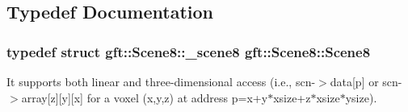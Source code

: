 \subsection{Typedef Documentation}
\hypertarget{namespacegft_1_1Scene8_a78f9a172f8a505f9577adac7f85bc009}{
\subsubsection[{Scene8}]{\setlength{\rightskip}{0pt plus 5cm}typedef struct {\bf gft\-::\-Scene8\-::\-\_\-scene8}  {\bf gft\-::\-Scene8\-::\-Scene8}}}\label{namespacegft_1_1Scene8_a78f9a172f8a505f9577adac7f85bc009}
It supports both linear and three-\/dimensional access (i.\-e., scn-\/$>$data\mbox{[}p\mbox{]} or scn-\/$>$array\mbox{[}z\mbox{]}\mbox{[}y\mbox{]}\mbox{[}x\mbox{]} for a voxel (x,y,z) at address p=x+y$\ast$xsize+z$\ast$xsize$\ast$ysize). 

